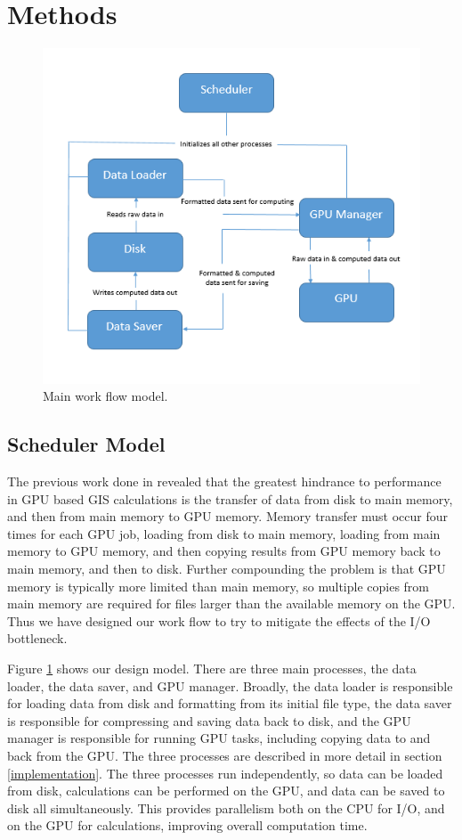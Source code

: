 \documentclass[journal]{IEEEtran}
\begin{document}
\section{Methods} \label{methods}
    \begin{figure}
        \includegraphics[width=\linewidth]{Model2.png}
        \caption{Main work flow model.}
        \label{model}
    \end{figure}
    \subsection{Scheduler Model}
    The previous work done in \cite{hpc_cuda} revealed that the greatest
    hindrance to performance in GPU based GIS calculations is the transfer of
    data from disk to main memory, and then from main memory to GPU memory.
    Memory transfer must occur four times for each GPU job, loading from disk
    to main memory, loading from main memory to GPU memory, and then copying
    results from GPU memory back to main memory, and then to disk.  Further
    compounding the problem is that GPU memory is typically more limited than
    main memory, so multiple copies from main memory are required for files
    larger than the available memory on the GPU. Thus we have designed our
    work flow to try to mitigate the effects of the I/O bottleneck.

    Figure \ref{model} shows our design model. There are three main processes,
    the data loader, the data saver, and GPU manager. Broadly, the data loader
    is responsible for loading data from disk and formatting from its initial
    file type, the data saver is responsible for compressing and saving data
    back to disk, and the GPU manager is responsible for running GPU tasks,
    including copying data to and back from the GPU. The three processes are
    described in more detail in section \ref{implementation}. The three
    processes run independently, so data can be loaded from disk, calculations
    can be performed on the GPU, and data can be saved to disk all
    simultaneously.  This provides parallelism both on the CPU for I/O, and on
    the GPU for calculations, improving overall computation time.
    
\end{document}
